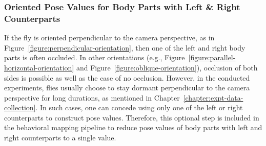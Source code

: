 \subsubsection{Oriented Pose Values for Body Parts with Left \& Right Counterparts}\label{section:oriented-pose-values}
If the fly is oriented perpendicular to the camera perspective, as in Figure~\ref{figure:perpendicular-orientation}, then one of the left and right body parts is often occluded.
In other orientations (e.g., Figure~\ref{figure:parallel-horizontal-orientation} and Figure~\ref{figure:oblique-orientation}),   occlusion of both sides  is possible as well as the case of no occlusion.
However, in the conducted experiments, flies usually choose to stay dormant perpendicular to the camera perspective for long durations, as mentioned in Chapter~\ref{chapter:expt-data-collection}.
In such cases, one can concede using only one of the left or right counterparts to construct pose values.
Therefore, this optional step is included in the behavioral mapping pipeline to reduce pose values of body parts with left and right counterparts to a single value.

